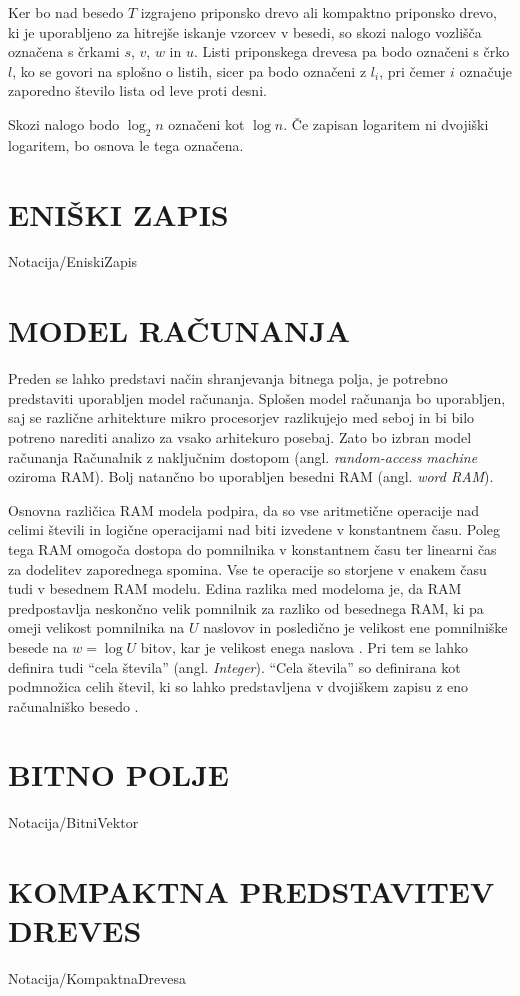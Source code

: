 Ker bo nad besedo $T$ izgrajeno priponsko drevo ali kompaktno priponsko drevo, ki je uporabljeno za hitrejše iskanje vzorcev v besedi, so skozi nalogo vozlišča označena s črkami $s$, $v$, $w$ in $u$. Listi priponskega drevesa pa bodo označeni s črko $l$, ko se govori na splošno o listih, sicer pa bodo označeni z $l_i$, pri čemer $i$ označuje zaporedno število lista od leve proti desni.

Skozi nalogo bodo $\log_2{n}$ označeni kot $\log{n}$. Če zapisan logaritem ni dvojiški logaritem, bo osnova le tega označena.


\section{ENIŠKI ZAPIS}\label{sec:Eniski_Zapis}
{Notacija/EniskiZapis}

\section{MODEL RAČUNANJA}\label{sec:Model_racunanja}
Preden se lahko predstavi način shranjevanja bitnega polja, je potrebno predstaviti uporabljen model računanja. Splošen model računanja bo uporabljen, saj se različne arhitekture mikro procesorjev razlikujejo med seboj in bi bilo potreno narediti analizo za vsako arhitekuro posebaj. Zato bo izbran model računanja Računalnik z naključnim dostopom (angl. \textit{random-access machine} oziroma RAM). Bolj natančno bo uporabljen besedni RAM  (angl. \textit{word RAM}).

Osnovna različica RAM modela podpira, da so vse aritmetične operacije nad celimi števili in logične operacijami nad biti izvedene v konstantnem času. Poleg tega RAM omogoča dostopa do pomnilnika v konstantnem času ter linearni čas za dodelitev zaporednega spomina. Vse te operacije so storjene v enakem času tudi v besednem RAM modelu. Edina razlika med modeloma je, da RAM predpostavlja neskončno velik pomnilnik za razliko od besednega RAM, ki pa omeji velikost pomnilnika na $U$ naslovov in posledično je velikost ene pomnilniške besede na $w=\log{U}$ bitov, kar je velikost enega naslova \cite{Fredman1990,Morin2013,Navarro2016}. Pri tem se lahko definira tudi \enquote{cela števila} (angl. \textit{Integer}). \enquote{Cela števila} so definirana kot podmnožica celih števil, ki so lahko predstavljena v dvojiškem zapisu z eno računalniško besedo \cite{Navarro2016}.

\section{BITNO POLJE}\label{sec:Bitno_Polje}
{Notacija/BitniVektor}


\section{KOMPAKTNA PREDSTAVITEV DREVES}\label{sec:kompaktna_drevesa}
{Notacija/KompaktnaDrevesa}